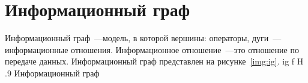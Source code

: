\chapter{Информационный граф}

Информационный граф~---модель, в которой вершины: операторы,
дуги~---информационные отношения.
Информационное отношение~---это отношение по передаче данных.
Информационный граф представлен на рисунке~\ref{img:ig}.
	{ig}
	{f}
	{H}
	{.9\textwidth}
	{Информационный граф}
